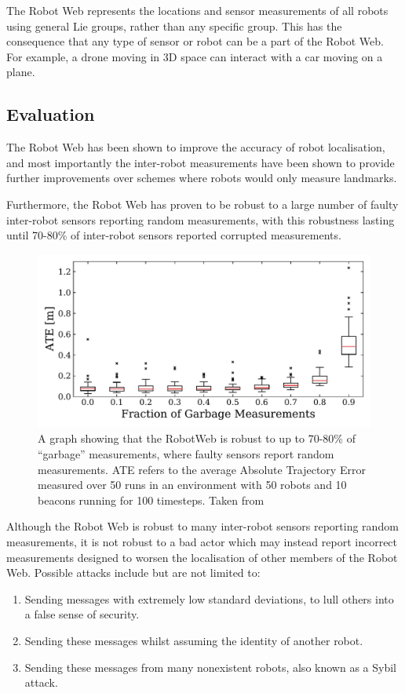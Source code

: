 The Robot Web represents the locations and sensor measurements of all robots using general Lie groups, rather than any specific group. This has the consequence that any type of sensor or robot can be a part of the Robot Web. For example, a drone moving in 3D space can interact with a car moving on a plane.

\subsection{Evaluation}
The Robot Web has been shown to improve the accuracy of robot localisation, and most importantly the inter-robot measurements have been shown to provide further improvements over schemes where robots would only measure landmarks. %

Furthermore, the Robot Web has proven to be robust to a large number of faulty inter-robot sensors reporting random measurements, with this robustness lasting until 70-80\% of inter-robot sensors reported corrupted measurements.

\begin{figure}[!h]
    \centering
    \includegraphics[page=1,width=.60\textwidth]{diagrams/sensor_noise.pdf}
    \caption[RobotWeb's robustness to garbage measurements]{A graph showing that the RobotWeb is robust to up to 70-80\% of ``garbage'' measurements, where faulty sensors report random measurements. ATE refers to the average Absolute Trajectory Error measured over 50 runs in an environment with 50 robots and 10 beacons running for 100 timesteps. Taken from \cite[Figure~5]{Robotweb}}
\end{figure}

Although the Robot Web is robust to many inter-robot sensors reporting random measurements, it is not robust to a bad actor which may instead report incorrect measurements designed to worsen the localisation of other members of the Robot Web. Possible attacks include but are not limited to:

\begin{enumerate}
    \item Sending messages with extremely low standard deviations, to lull others into a false sense of security.
    \item Sending these messages whilst assuming the identity of another robot.
    \item Sending these messages from many nonexistent robots, also known as a Sybil attack.
\end{enumerate}

